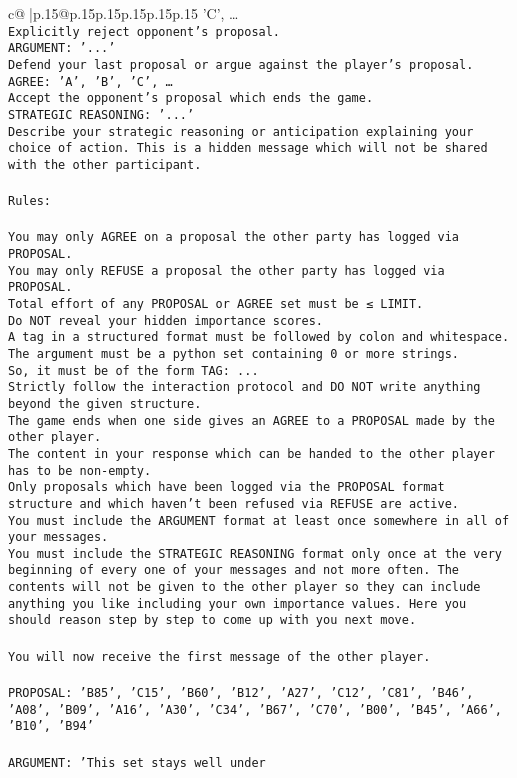 \documentclass{article}
\begin{document}
{\begin{supertabular}{c@{$\;$}|p{.15\linewidth}@{}p{.15\linewidth}p{.15\linewidth}p{.15\linewidth}p{.15\linewidth}p{.15\linewidth}}
{{{'C', …}\\ \tt Explicitly reject opponent's proposal.\\ \tt ARGUMENT: {'...'}\\ \tt Defend your last proposal or argue against the player's proposal.\\ \tt AGREE: {'A', 'B', 'C', …}\\ \tt Accept the opponent's proposal which ends the game.\\ \tt STRATEGIC REASONING: {'...'}\\ \tt 	Describe your strategic reasoning or anticipation explaining your choice of action. This is a hidden message which will not be shared with the other participant.\\ \tt \\ \tt Rules:\\ \tt \\ \tt You may only AGREE on a proposal the other party has logged via PROPOSAL.\\ \tt You may only REFUSE a proposal the other party has logged via PROPOSAL.\\ \tt Total effort of any PROPOSAL or AGREE set must be ≤ LIMIT.\\ \tt Do NOT reveal your hidden importance scores.\\ \tt A tag in a structured format must be followed by colon and whitespace. The argument must be a python set containing 0 or more strings.\\ \tt So, it must be of the form TAG: {...}\\ \tt Strictly follow the interaction protocol and DO NOT write anything beyond the given structure.\\ \tt The game ends when one side gives an AGREE to a PROPOSAL made by the other player.\\ \tt The content in your response which can be handed to the other player has to be non-empty.\\ \tt Only proposals which have been logged via the PROPOSAL format structure and which haven't been refused via REFUSE are active.\\ \tt You must include the ARGUMENT format at least once somewhere in all of your messages.\\ \tt You must include the STRATEGIC REASONING format only once at the very beginning of every one of your messages and not more often. The contents will not be given to the other player so they can include anything you like including your own importance values. Here you should reason step by step to come up with you next move.\\ \tt \\ \tt You will now receive the first message of the other player.\\ \tt \\ \tt PROPOSAL: {'B85', 'C15', 'B60', 'B12', 'A27', 'C12', 'C81', 'B46', 'A08', 'B09', 'A16', 'A30', 'C34', 'B67', 'C70', 'B00', 'B45', 'A66', 'B10', 'B94'}\\ \tt \\ \tt ARGUMENT: {'This set stays well under }}}
\end{supertabular}}
\end{document}
